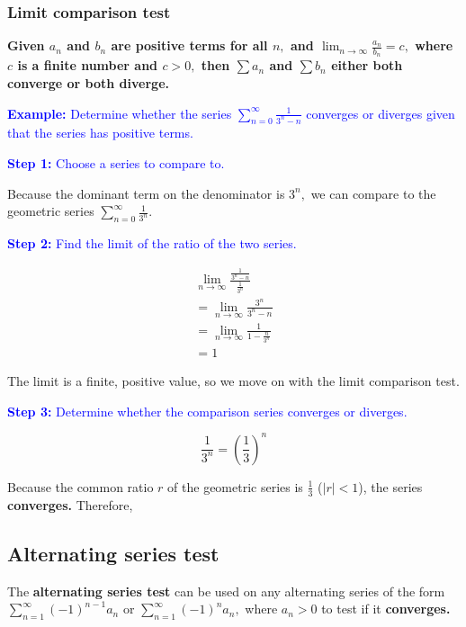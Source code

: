 \documentclass[letterpaper, 12pt]{article}
\newcommand{\example}[1]{\textcolor{blue}{\textbf{Example:} #1}}
\newcommand{\step}[2]{\textcolor{blue}{\textbf{Step #1:} #2}}
\begin{document}
\subsubsection*{Limit comparison test}

\textbf{Given $a_n$ and $b_n$ are positive terms for all $n,$ and $\displaystyle \lim_{n \to \infty} \frac{a_n}{b_n} = c,$ where $c$ is a finite number and $c > 0,$ \textbf{then $\displaystyle \sum a_n$ and $\displaystyle \sum b_n$ either both converge or both diverge.}}

\example{Determine whether the series $\displaystyle \sum_{n=0}^\infty \frac{1}{3^n-n}$ converges or diverges given that the series has positive terms.}

\step{1}{Choose a series to compare to.}

Because the dominant term on the denominator is $3^n,$ we can compare to the geometric series $\displaystyle \sum_{n=0}^\infty \frac{1}{3^n}.$

\step{2}{Find the limit of the ratio of the two series.}

\begin{gather*}
\lim_{n \to \infty} \frac{\frac{1}{3^n-n}}{\frac{1}{3^n}} \\
= \lim_{n \to \infty} \frac{3^n}{3^n - n} \\
= \lim_{n \to \infty} \frac{1}{1 - \frac{n}{3^n}} \\
= 1
\end{gather*}

The limit is a finite, positive value, so we move on with the limit comparison test.

\step{3}{Determine whether the comparison series converges or diverges.}

$$\frac{1}{3^n} = \left(\frac{1}{3}\right)^n$$

Because the common ratio $r$ of the geometric series is $\frac13$ ($|r| < 1$), the series \textbf{converges.} Therefore, 

\subsection*{Alternating series test}

The \textbf{alternating series test} can be used on any alternating series of the form $\displaystyle \sum_{n=1}^\infty (-1)^{n-1} a_n$ or $\displaystyle \sum_{n=1}^\infty (-1)^n a_n,$ where $a_n > 0$ to test if it \textbf{converges.}
\end{document}

